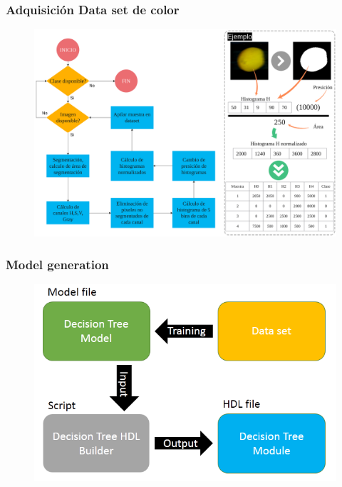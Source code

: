 \documentclass[
serif,
compress,
xcolor=table,
dvipsnames,
]{beamer}
\begin{document}
\begin{frame}
	\frametitle{Adquisición Data set de color}
	
	
	
	\begin{figure}[h]
		\centering
		\includegraphics[width=\linewidth]{F/dscolor}  
		\label{ftex}
	\end{figure}
	
\end{frame}



\begin{frame}
	\frametitle{Model generation}
	
	\begin{figure}[h]
		\centering
		\includegraphics[width=0.7\linewidth]{weka_overview.png}  
		\label{weki}
	\end{figure}
\end{frame}
\end{document}
